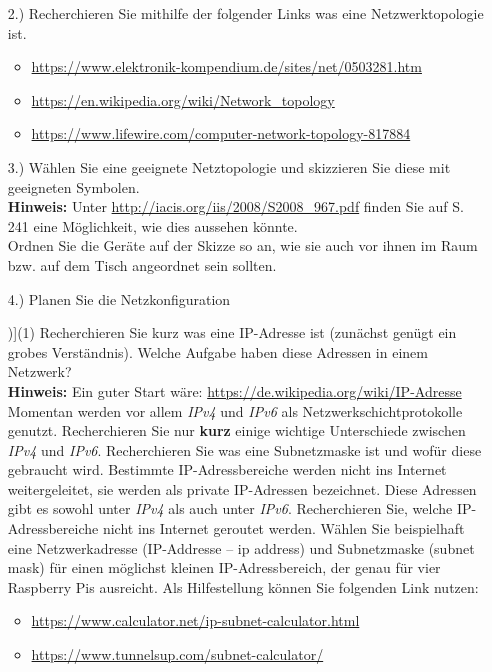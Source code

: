 \documentclass[paper=a4,fontsize=11pt]{scrartcl}%
\numberwithin{equation}{section}
\begin{document}
\begin{itemize}
	\item[2.)] Recherchieren Sie mithilfe der folgender Links was eine Netzwerktopologie ist.
	\begin{itemize}
		\item \url{https://www.elektronik-kompendium.de/sites/net/0503281.htm}
		\item \url{https://en.wikipedia.org/wiki/Network_topology}
		\item \url{https://www.lifewire.com/computer-network-topology-817884}
	\end{itemize}
	\item[3.)] Wählen Sie eine geeignete Netztopologie und skizzieren Sie diese mit geeigneten Symbolen.\\ \textbf{Hinweis:} Unter \url{http://iacis.org/iis/2008/S2008_967.pdf} finden Sie auf S. 241 eine Möglichkeit, wie dies aussehen könnte.\\
	Ordnen Sie die Geräte auf der Skizze so an, wie sie auch vor ihnen im Raum bzw. auf dem Tisch angeordnet sein sollten.
	\item[4.)] Planen Sie die Netzkonfiguration
\begin{tasks}[counter-format=(tsk[r])](1)	
	\task Recherchieren Sie kurz was eine IP-Adresse ist (zunächst genügt ein grobes Verständnis). Welche Aufgabe haben diese Adressen in einem Netzwerk?\\
	\textbf{Hinweis:} Ein guter Start wäre: \url{https://de.wikipedia.org/wiki/IP-Adresse}
	\task Momentan werden vor allem \emph{IPv4} und \emph{IPv6} als Netzwerkschichtprotokolle genutzt. Recherchieren Sie nur \textbf{kurz} einige wichtige Unterschiede zwischen \emph{IPv4} und \emph{IPv6}.
	\task Recherchieren Sie was eine Subnetzmaske ist und wofür diese gebraucht wird.
	\task Bestimmte IP-Adressbereiche werden nicht ins Internet weitergeleitet, sie werden als private IP-Adressen bezeichnet. Diese Adressen gibt es sowohl unter \emph{IPv4} als auch unter \emph{IPv6}. Recherchieren Sie, welche IP-Adressbereiche nicht ins Internet geroutet werden.
	\task Wählen Sie beispielhaft eine Netzwerkadresse (IP-Addresse -- ip address) und Subnetzmaske (subnet mask) für einen möglichst kleinen IP-Adressbereich, der genau für vier Raspberry Pis ausreicht. Als Hilfestellung können Sie folgenden Link nutzen:
	\begin{itemize}
		\item \url{https://www.calculator.net/ip-subnet-calculator.html}
		\item \url{https://www.tunnelsup.com/subnet-calculator/}
	\end{itemize}
\end{tasks} 
\end{itemize}
\end{document}

